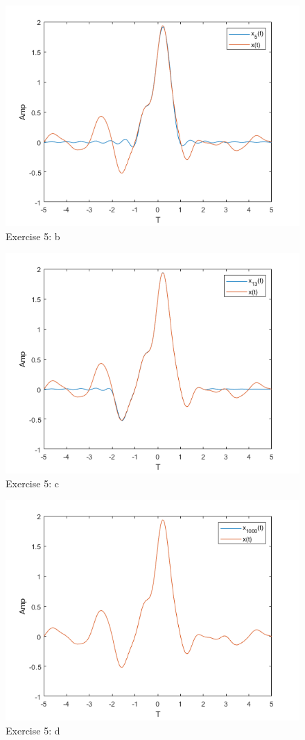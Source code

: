 \documentclass[a4paper]{article}
\begin{document}
\begin{figure}
    \centering
    \includegraphics{5b.png}
    \caption{Exercise 5: b}
    \label{fig:5b}
\end{figure}
\begin{figure}
    \centering
    \includegraphics{5c.png}
    \caption{Exercise 5: c}
    \label{fig:5c}
\end{figure}
\begin{figure}
    \centering
    \includegraphics{5d.png}
    \caption{Exercise 5: d}
    \label{fig:5d}
\end{figure}
\end{document}
